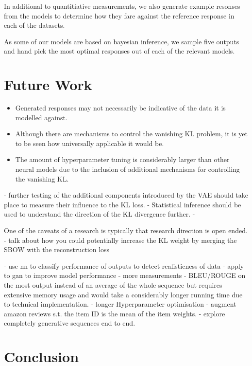 \documentclass[12pt,twoside]{report}
\begin{document}
In additional to quantitiative measurements, we also generate example resonses from the models to determine how they fare against the reference response in each of the datasets.


As some of our models are based on bayesian inference, we sample five outputs and hand pick the most optimal responses out of each of the relevant models. 


\chapter{Future Work}


\begin{itemize}  
\item Generated responses may not necessarily be indicative of the data it is modelled against.
\item Although there are mechanisms to control the vanishing KL problem, it is yet to be seen how universally applicable it would be.
\item The amount of hyperparameter tuning is considerably larger than other neural models due to the inclusion of additional mechanisms for controlling the vanishing KL.
\end{itemize}

- further testing of the additional components introduced by the VAE should take place to measure their influence to the KL loss.
- Statistical inference should be used to understand the direction of the KL divergence further.
- 

One of the caveats of a research is typically that research direction is open ended. 
- talk about how you could potentially increase the KL weight by merging the SBOW with the reconstruction loss

- use nn to classify performance of outputs to detect realisticness of data
- apply to gan to improve model performance
- more measurements
- BLEU/ROUGE on the most output instead of an average of the whole sequence but requires extensive memory usage and would take a considerably longer running time due to technical implementation.
- longer Hyperparameter optimisation
- augment amazon reviews s.t. the item ID is the mean of the item weights.
- explore completely generative sequences end to end.

\chapter{Conclusion}
\end{document}
